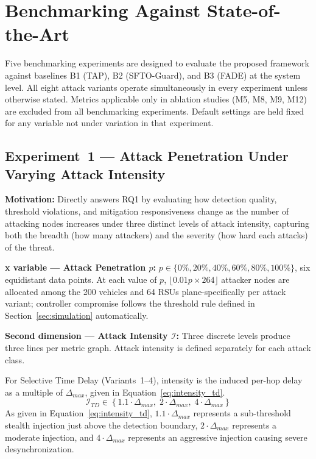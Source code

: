 \documentclass[12pt, a4paper]{report}
\begin{document}
{{\section{Benchmarking Against State-of-the-Art}
\label{sec:benchmarking}

Five benchmarking experiments are designed to evaluate
the proposed framework against baselines B1 (TAP),
B2 (SFTO-Guard), and B3 (FADE) at the system level.
All eight attack variants operate simultaneously in
every experiment unless otherwise stated. Metrics
applicable only in ablation studies (M5, M8, M9, M12)
are excluded from all benchmarking experiments.
Default settings are held fixed for any variable not
under variation in that experiment.


\subsection{Experiment~1 — Attack Penetration Under
Varying Attack Intensity}
\label{sec:exp1}

\textbf{Motivation:} Directly answers RQ1 by evaluating
how detection quality, threshold violations, and
mitigation responsiveness change as the number of
attacking nodes increases under three distinct levels
of attack intensity, capturing both the breadth
(how many attackers) and the severity (how hard each
attacks) of the threat.

\textbf{x variable — Attack Penetration $p$:}
$p \in \{0\%, 20\%, 40\%, 60\%, 80\%, 100\%\}$,
six equidistant data points. At each value of $p$,
$\lfloor 0.01p \times 264 \rfloor$ attacker nodes are
allocated among the 200 vehicles and 64 \ac{RSU}s
plane-specifically per attack variant; controller
compromise follows the threshold rule defined in
Section~\ref{sec:simulation} automatically.

\textbf{Second dimension — Attack Intensity $\mathcal{I}$:}
Three discrete levels produce three lines per metric
graph. Attack intensity is defined separately for each
attack class.

For Selective Time Delay (Variants~1--4), intensity is
the induced per-hop delay as a multiple of $\Delta_{max}$,
given in Equation~\eqref{eq:intensity_td}.
\begin{equation}
\mathcal{I}_{TD} \in
\left\{
1.1\cdot\Delta_{max},\;
2\cdot\Delta_{max},\;
4\cdot\Delta_{max}
\right\}
\label{eq:intensity_td}
\end{equation}
As given in Equation~\eqref{eq:intensity_td},
$1.1\cdot\Delta_{max}$ represents a sub-threshold
stealth injection just above the detection boundary,
$2\cdot\Delta_{max}$ represents a moderate injection,
and $4\cdot\Delta_{max}$ represents an aggressive
injection causing severe desynchronization.

}}
\end{document}
